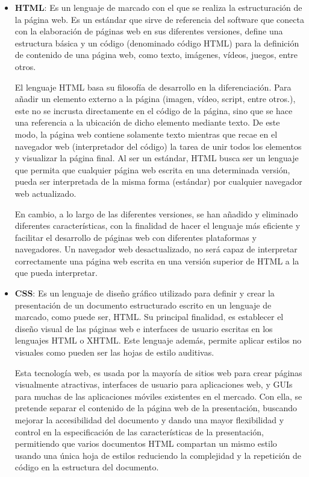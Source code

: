 \begin{itemize}
\item \textbf{HTML}: Es un lenguaje de marcado con el que se realiza la estructuración de la página web. Es un estándar que sirve de referencia del software que conecta con la elaboración de páginas web en sus diferentes versiones, define una estructura básica y un código (denominado código HTML) para la definición de contenido de una página web, como texto, imágenes, vídeos, juegos, entre otros. 

El lenguaje HTML basa su filosofía de desarrollo en la diferenciación. Para añadir un elemento externo a la página (imagen, vídeo, script, entre otros.), este no se incrusta directamente en el código de la página, sino que se hace una referencia a la ubicación de dicho elemento mediante texto. De este modo, la página web contiene solamente texto mientras que recae en el navegador web (interpretador del código) la tarea de unir todos los elementos y visualizar la página final. Al ser un estándar, HTML busca ser un lenguaje que permita que cualquier página web escrita en una determinada versión, pueda ser interpretada de la misma forma (estándar) por cualquier navegador web actualizado.

En cambio, a lo largo de las diferentes versiones, se han añadido y eliminado diferentes características, con la finalidad de hacer el lenguaje más eficiente y facilitar el desarrollo de páginas web con diferentes plataformas y navegadores. Un navegador web  desactualizado, no será capaz de interpretar correctamente una página web escrita en una versión superior de HTML a la que pueda interpretar.  

\item \textbf{CSS}: Es un lenguaje de diseño gráfico utilizado para definir y crear la presentación de un documento estructurado escrito en un lenguaje de marcado, como puede ser, HTML. Su principal finalidad, es establecer el diseño visual de las páginas web e interfaces de usuario escritas en los lenguajes HTML o XHTML. Este lenguaje además, permite aplicar estilos no visuales como pueden ser las hojas de estilo auditivas.

Esta tecnología web, es usada por la mayoría de sitios web para crear páginas visualmente atractivas, interfaces de usuario para aplicaciones web, y GUIs para muchas de las aplicaciones móviles existentes en el mercado. Con ella, se pretende separar el contenido de la página web de la presentación, buscando mejorar la accesibilidad del documento y dando una mayor flexibilidad y control en la especificación de las características de la presentación, permitiendo que varios documentos HTML compartan un mismo estilo usando una única hoja de estilos reduciendo la complejidad y la repetición de código en la estructura del documento.


\end{itemize}
